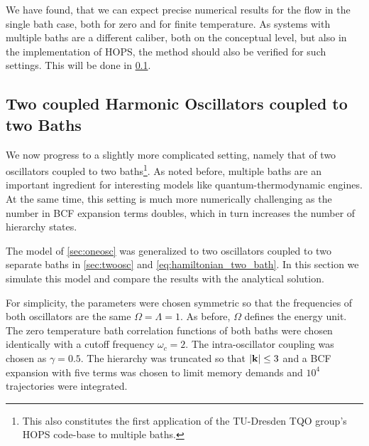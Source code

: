 We have found, that we can expect precise numerical results for the
flow in the single bath case, both for zero and for finite
temperature. As systems with multiple baths are a different caliber,
both on the conceptual level, but also in the implementation of HOPS,
the method should also be verified for such settings. This will be
done in \cref{sec:twoosccomp}.


\subsection{Two coupled Harmonic Oscillators coupled to two Baths}
\label{sec:twoosccomp}
We now progress to a slightly more complicated setting, namely that of
two oscillators coupled to two baths\footnote{This also constitutes
  the first application of the TU-Dresden TQO group's HOPS code-base
  to multiple baths.}. As noted before, multiple baths are an
important ingredient for interesting models like quantum-thermodynamic
engines. At the same time, this setting is much more numerically
challenging as the number in BCF expansion terms doubles, which in
turn increases the number of hierarchy states.

The model of \cref{sec:oneosc} was generalized to two oscillators
coupled to two separate baths in \cref{sec:twoosc} and
\cref{eq:hamiltonian_two_bath}. In this section we simulate this model
and compare the results with the analytical solution.

For simplicity, the parameters were chosen symmetric so that the
frequencies of both oscillators are the same \(Ω=Λ=1\). As before,
\(Ω\) defines the energy unit. The zero temperature bath correlation
functions of both baths were chosen identically with a cutoff
frequency \(ω_c=2\). The intra-oscillator coupling was chosen as
\(γ=0.5\). The hierarchy was truncated so that \(\abs{\vb{k}}\leq 3\)
and a BCF expansion with five terms was chosen to limit memory demands
and \(10^{4}\) trajectories were integrated.

